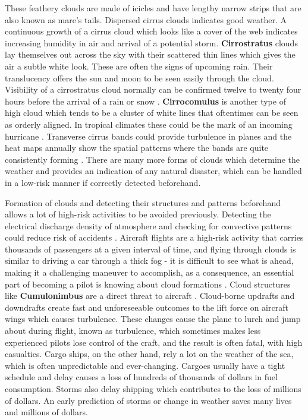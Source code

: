\documentclass[conference]{IEEEtran}
\begin{document}
These feathery clouds are made of icicles and have lengthy narrow strips that are also known as mare’s tails. Dispersed cirrus clouds indicates good weather. A continuous growth of a cirrus cloud which looks like a cover of the web indicates increasing humidity in air and arrival of a potential storm. \textbf{Cirrostratus} clouds lay themselves out across the sky with their scattered thin lines which gives the air a subtle white look. These are often the signs of upcoming rain. Their translucency offers the sun and moon to be seen easily through the cloud. Visibility of a cirrostratus cloud normally can be confirmed twelve to twenty four hours before the arrival of a rain or snow \cite{gadsden1989noctilucent}. \textbf{Cirrocomulus} is another type of high cloud which tends to be a cluster of white lines that oftentimes can be seen as orderly aligned. In tropical climates these could be the mark of an incoming hurricane \cite{mclean1957cloud}. Transverse cirrus bands could provide turbulence in planes and the heat maps annually show the spatial patterns where the bands are quite consistently forming \cite{miller2018detection}. There are many more forms of clouds which determine the weather and provides an indication of any natural disaster, which can be handled in a low-risk manner if correctly detected beforehand.

Formation of clouds and detecting their structures and patterns beforehand allows a lot of high-risk activities to be avoided previously. Detecting the electrical discharge density of atmosphere and checking for convective patterns could reduce risk of accidents \cite{de2013new}.  Aircraft flights are a high-risk activity that carries thousands of passengers at a given interval of time, and flying through clouds is similar to driving a car through a thick fog - it is difficult to see what is ahead, making it a challenging maneuver to accomplish, as a consequence, an essential part of becoming a pilot is knowing about cloud formations \cite{zhang2011impact}. Cloud structures like \textbf{Cumulonimbus} are a direct threat to aircraft \cite{mason2006ice}. Cloud-borne updrafts and downdrafts create fast and unforeseeable outcomes to the lift force on aircraft wings which causes turbulence. These changes cause the plane to lurch and jump about during flight, known as turbulence, which sometimes makes less experienced pilots lose control of the craft, and the result is often fatal, with high casualties. Cargo ships, on the other hand, rely a lot on the weather of the sea, which is often unpredictable and ever-changing. Cargoes usually have a tight schedule and delay causes a loss of hundreds of thousands of dollars in fuel consumption. Storms also delay shipping which contributes to the loss of millions of dollars. An early prediction of storms or change in weather saves many lives and millions of dollars.
\end{document}
